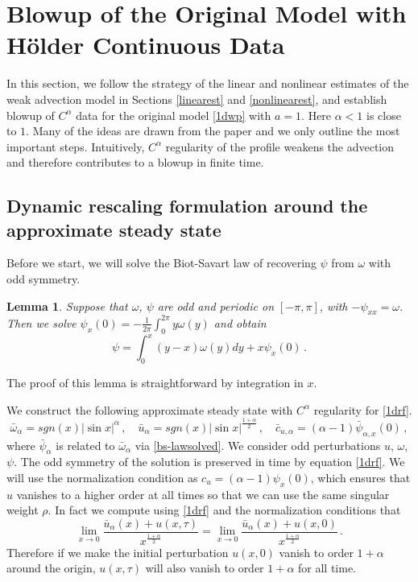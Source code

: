 \documentclass[12pt]{caltech_thesis}
\newtheorem{lemma}[theorem]{Lemma}
\numberwithin{equation}{section}
\begin{document}
\section{Blowup of the Original Model with H\"older Continuous Data}
\label{sec hol}
In this section, we follow the strategy of the linear and nonlinear estimates of the weak advection model in Sections \ref{linearest} and \ref{nonlinearest}, and establish blowup of $C^{\alpha}$ data for the original model \eqref{1dwp} with $a=1$. Here $\alpha<1$ is close to $1$. Many of the ideas are drawn from the paper \cite{chen2021regularity} and we only outline the most important steps. Intuitively, $C^{\alpha}$ regularity of the profile weakens the advection and therefore contributes to a blowup in finite time.
\subsection{Dynamic rescaling formulation around the approximate steady state}
Before we start, we will solve the Biot-Savart law of recovering $\psi$ from $\omega$ with odd symmetry.
\begin{lemma}
\label{alpha est}
    Suppose that $\omega$, $\psi$ are odd and periodic on $[-\pi,\pi]$, with $-\psi_{xx}=\omega$. Then we solve $\psi_x(0)=-\frac{1}{2\pi}\int_{0}^{2\pi}y{\omega}(y)$ and obtain \begin{equation}\label{bs-lawsolved}
        \psi=\int_{0}^{x}(y-x){\omega}(y)dy+x\psi_x(0)\,.
    \end{equation}
\end{lemma}
The proof of this lemma is straightforward by integration in $x$.

We construct the following approximate steady state with $C^{\alpha}$ regularity for \eqref{1drf}.
$$\bar{\omega}_{\alpha}=sgn(x)|\sin x|^{\alpha}\,,\quad\bar{u}_{\alpha}=sgn(x)|\sin x|^{\frac{1+\alpha}{2}}\,,\quad \bar{c}_{u, {\alpha}}=(\alpha-1)\bar{\psi}_{{\alpha},x}(0)\,,$$
where $\bar{\psi}_{\alpha}$ is related to $\bar{\omega}_{\alpha}$ via \eqref{bs-lawsolved}.
We consider odd perturbations $u$, $\omega$, $\psi$. The odd symmetry of the solution is preserved in time by equation \eqref{1drf}.  We will use the normalization condition as $c_u=(\alpha-1){\psi}_x(0)$, which ensures that $u$ vanishes to a higher order at all times so that we can use the same singular weight $\rho$. In fact we compute using \eqref{1drf} and the normalization conditions that $$\lim_{x\to 0}\frac{\bar{u}_{{\alpha}}(x)+u(x,\tau)}{x^{\frac{1+\alpha}{2}}}=\lim_{x\to 0}\frac{\bar{u}_{{\alpha}}(x)+u(x,0)}{x^{\frac{1+\alpha}{2}}}\,.$$ 
Therefore if we make the initial perturbation $u(x,0)$ vanish to order $1+\alpha$ around the origin,  $u(x,\tau)$ will also vanish to order $1+\alpha$ for all time. 
\end{document}
